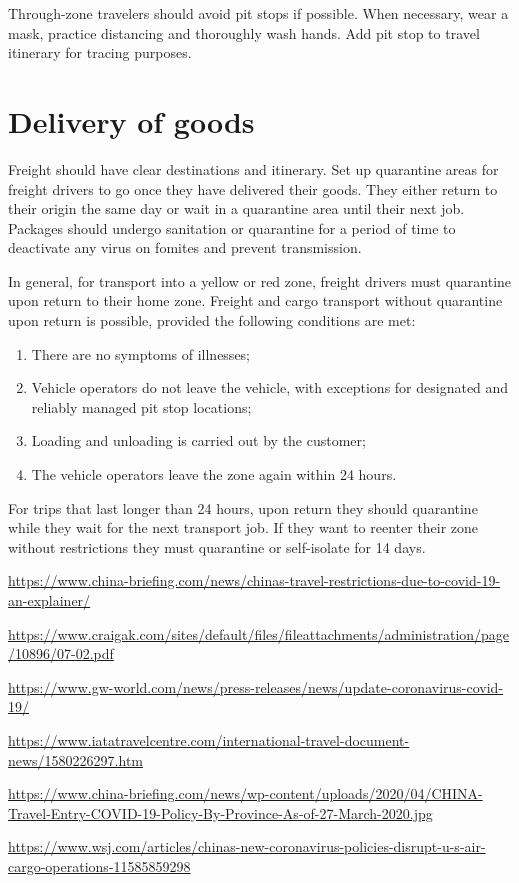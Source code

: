 \documentclass[onecolumn,journal]{IEEEtran}
\begin{document}
\begin{multicols}{2}
Through-zone travelers should avoid pit stops if possible. When necessary, wear a mask, practice distancing and thoroughly wash hands. Add pit stop to travel itinerary for tracing purposes.

\section{Delivery of goods}

Freight should have clear destinations and itinerary. Set up quarantine areas for freight drivers to go once they have delivered their goods. They either return to their origin the same day or wait in a quarantine area until their next job.
Packages should undergo sanitation or quarantine for a period of time to deactivate any virus on fomites and prevent transmission.

In general, for transport into a yellow or red zone, freight drivers must quarantine upon return to their home zone. Freight and cargo transport without quarantine upon return is possible, provided the following conditions are met:
\begin{enumerate}
\item There are no symptoms of illnesses;
\item Vehicle operators do not leave the vehicle, with exceptions for designated and reliably managed pit stop locations;
\item Loading and unloading is carried out by the customer;
\item The vehicle operators leave the zone again within 24 hours.
\end{enumerate}
For trips that last longer than 24 hours, upon return they should quarantine while they wait for the next transport job.  If they want to reenter their zone without restrictions they must quarantine or self-isolate for 14 days.

\end{multicols}
\begin{thebibliography}{20}

 \url{https://www.china-briefing.com/news/chinas-travel-restrictions-due-to-covid-19-an-explainer/}

 \url{https://www.craigak.com/sites/default/files/fileattachments/administration/page/10896/07-02.pdf}

 \url{https://www.gw-world.com/news/press-releases/news/update-coronavirus-covid-19/}

 \url{https://www.iatatravelcentre.com/international-travel-document-news/1580226297.htm}

 \url{https://www.china-briefing.com/news/wp-content/uploads/2020/04/CHINA-Travel-Entry-COVID-19-Policy-By-Province-As-of-27-March-2020.jpg}

 \url{https://www.wsj.com/articles/chinas-new-coronavirus-policies-disrupt-u-s-air-cargo-operations-11585859298}


\end{thebibliography}

% 
\end{document}
